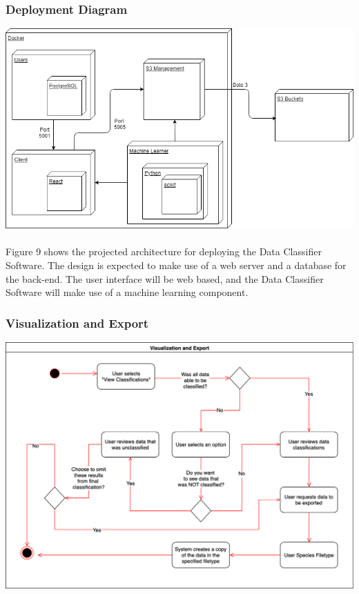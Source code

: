 \documentclass[12pt,oneside,letterpaper]{article}
\begin{document}
 \subsubsection{Deployment Diagram}
\includegraphics[scale = 0.60]{bread_deployment_diagram_updated.png}
\begingroup
{}
\endgroup

\paragraph{}Figure 9 shows the projected architecture for deploying the Data Classifier Software. The design is expected to make use of a web server and a database for the back-end. The user interface will be web based, and the Data Classifier Software will make use of a machine learning component.

\subsubsection{Visualization and Export}
\includegraphics[scale = 0.40]{LandonExportActivityDiagram.png}
\begingroup
{}
\endgroup
\end{document}
